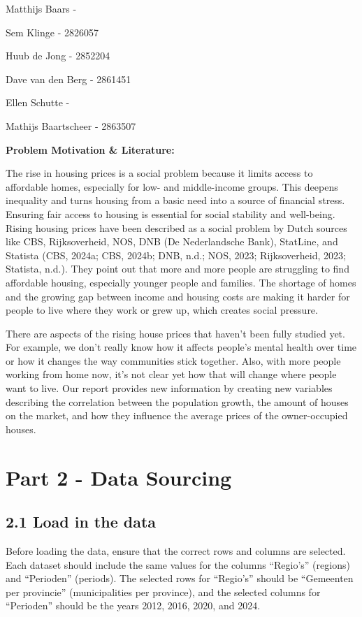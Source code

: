 \documentclass[
]{article}
\begin{document}
Matthijs Baars -

Sem Klinge - 2826057

Huub de Jong - 2852204

Dave van den Berg - 2861451

Ellen Schutte -

Mathijs Baartscheer - 2863507

\textbf{Problem Motivation \& Literature:}

The rise in housing prices is a social problem because it limits access
to affordable homes, especially for low- and middle-income groups. This
deepens inequality and turns housing from a basic need into a source of
financial stress. Ensuring fair access to housing is essential for
social stability and well-being. Rising housing prices have been
described as a social problem by Dutch sources like CBS, Rijksoverheid,
NOS, DNB (De Nederlandsche Bank), StatLine, and Statista (CBS, 2024a;
CBS, 2024b; DNB, n.d.; NOS, 2023; Rijksoverheid, 2023; Statista, n.d.).
They point out that more and more people are struggling to find
affordable housing, especially younger people and families. The shortage
of homes and the growing gap between income and housing costs are making
it harder for people to live where they work or grew up, which creates
social pressure.

\hfill\break
There are aspects of the rising house prices that haven't been fully
studied yet. For example, we don't really know how it affects people's
mental health over time or how it changes the way communities stick
together. Also, with more people working from home now, it's not clear
yet how that will change where people want to live. Our report provides
new information by creating new variables describing the correlation
between the population growth, the amount of houses on the market, and
how they influence the average prices of the owner-occupied houses.

\section{Part 2 - Data Sourcing}\label{part-2---data-sourcing}

\subsection{2.1 Load in the data}\label{load-in-the-data}

Before loading the data, ensure that the correct rows and columns are
selected. Each dataset should include the same values for the columns
``Regio's'' (regions) and ``Perioden'' (periods). The selected rows for
``Regio's'' should be ``Gemeenten per provincie'' (municipalities per
province), and the selected columns for ``Perioden'' should be the years
2012, 2016, 2020, and 2024.
\end{document}
